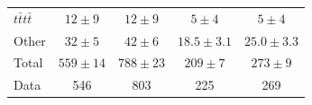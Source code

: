 \documentclass[cernpreprint, atlasdraft=false, texlive=2023, UKenglish, texmf, orcidlogo]{atlasdoc}
\begin{document}
\begin{table}[htbp]
\begin{center}
\begin{tabular}{l|c|c|c|c}
$t\bar{t}t\bar{t}$              & $12\pm9$                         & $12\pm9$                        & \phantom{0}$5\pm4$           & \phantom{0}$5\pm4$   \\
Other                              & $32\pm5$                         & $42\pm6$                        & $18.5\pm3.1$                       & $25.0\pm3.3$  \\
\hline \hline
Total                               & $559\pm14$                      & $788\pm23$                    & $209\pm7$\phantom{0}       & $273\pm9$\phantom{0} \\
\hline
Data                               & 546                                    & 803                                  & 225                                      & 269           \\
\hline
\end{tabular}
\end{center}
\end{table}
 
 
 
\end{document}
